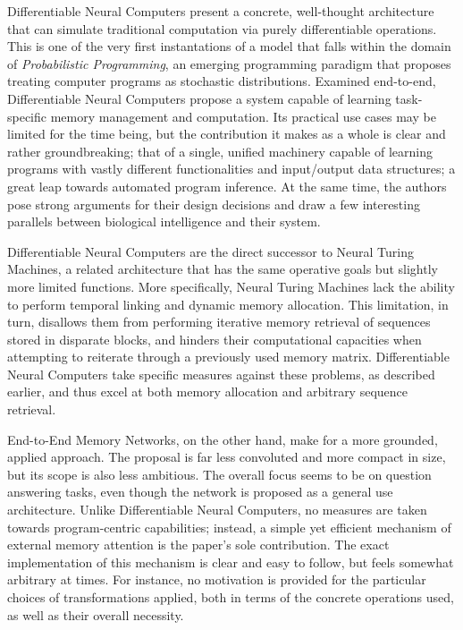 \documentclass[]{article}
\begin{document}
Differentiable Neural Computers present a concrete, well-thought architecture that can simulate traditional computation via purely differentiable operations. This is one of the very first instantations of a model that falls within the domain of \textit{Probabilistic Programming}\cite{Meijer}, an emerging programming paradigm that proposes treating computer programs as stochastic distributions. Examined end-to-end, Differentiable Neural Computers propose a system capable of learning task-specific memory management and computation. Its practical use cases may be limited for the time being, but the contribution it makes as a whole is clear and rather groundbreaking; that of a single, unified machinery capable of learning programs with vastly different functionalities and input/output data structures; a great leap towards automated program inference. At the same time, the authors pose strong arguments for their design decisions and draw a few interesting parallels between biological intelligence and their system. 

Differentiable Neural Computers are the direct successor to Neural Turing Machines\cite{DBLP:journals/corr/GravesWD14}, a related architecture that has the same operative goals but slightly more limited functions. More specifically, Neural Turing Machines lack the ability to perform temporal linking and dynamic memory allocation. This limitation, in turn, disallows them from performing iterative memory retrieval of sequences stored in disparate blocks, and hinders their computational capacities when attempting to reiterate through a previously used memory matrix. Differentiable Neural Computers take specific measures against these problems, as described earlier, and thus excel at both memory allocation and arbitrary sequence retrieval.

End-to-End Memory Networks, on the other hand, make for a more grounded, applied approach. The proposal is far less convoluted and more compact in size, but its scope is also less ambitious. The overall focus seems to be on question answering tasks, even though the network is proposed as a general use architecture. Unlike Differentiable Neural Computers, no measures are taken towards program-centric capabilities; instead, a simple yet efficient mechanism of external memory attention is the paper's sole contribution. The exact implementation of this mechanism is clear and easy to follow, but feels somewhat arbitrary at times. For instance, no motivation is provided for the particular choices of transformations applied, both in terms of the concrete operations used, as well as their overall necessity. 
\end{document}
